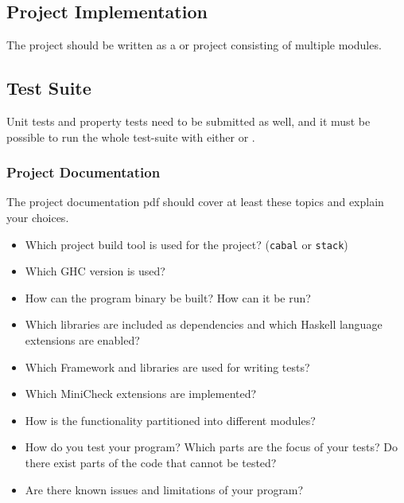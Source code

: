 \documentclass{article}
\begin{document}
\subsection{Project Implementation}

The project should be written as a  or  project consisting of multiple modules.

\subsection{Test Suite}

Unit tests and property tests need to be submitted as well, and it must be possible to run the whole test-suite with either  or .

\subsubsection{Project Documentation}

The project documentation pdf should cover at least these topics and explain your choices.

\begin{itemize}
\item Which project build tool is used for the project? (\texttt{cabal} or \texttt{stack})
\item Which GHC version is used?
\item How can the program binary be built? How can it be run?
\item Which libraries are included as dependencies and which Haskell language extensions are enabled?
\item Which Framework and libraries are used for writing tests?
\item Which MiniCheck extensions are implemented?
\item How is the functionality partitioned into different modules?
\item How do you test your program? Which parts are the focus of your tests? Do there exist parts of the code that cannot be tested?
\item Are there known issues and limitations of your program?
\end{itemize}

\vspace*{1cm}

\printbibliography
\end{document}
